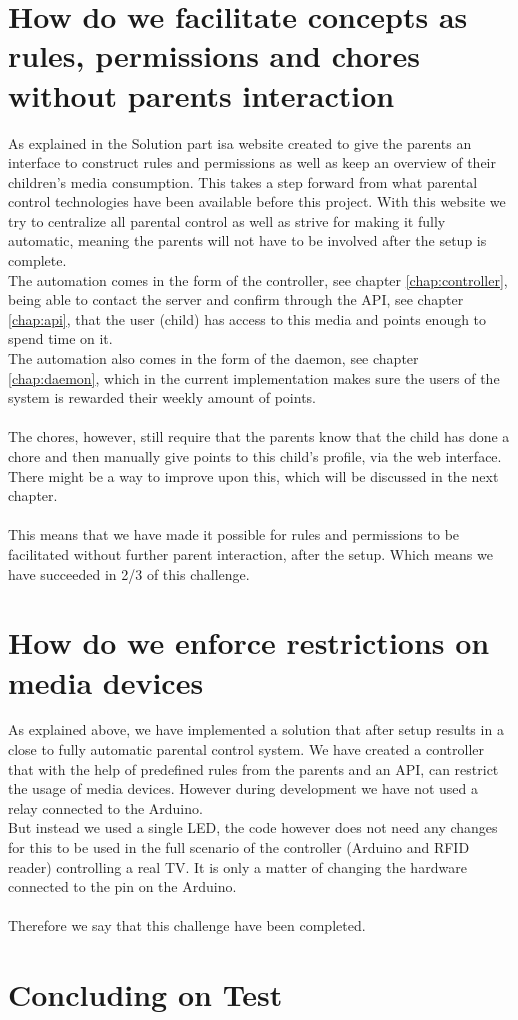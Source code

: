 \section*{How do we facilitate concepts as rules, permissions and chores without parents interaction}
As explained in the Solution part  isa website created to give the parents an interface to construct rules and permissions as well as keep an overview of their children's media consumption. This takes a step forward from what parental control technologies have been available before this project. With this website we try to centralize all parental control as well as strive for making it fully automatic, meaning the parents will not have to be involved after the setup is complete.\\
The automation comes in the form of the controller, see chapter \vref{chap:controller}, being able to contact the server and confirm through the API, see chapter \vref{chap:api}, that the user (child) has access to this media and points enough to spend time on it.\\
The automation also comes in the form of the daemon, see chapter \vref{chap:daemon}, which in the current implementation makes sure the users of the system is rewarded their weekly amount of points.\\
\\
The chores, however, still require that the parents know that the child has done a chore and then manually give points to this child's profile, via the web interface. There might be a way to improve upon this, which will be discussed in the next chapter.\\
\\
This means that we have made it possible for rules and permissions to be facilitated without further parent interaction, after the setup. Which means we have succeeded in 2/3 of this challenge.

\section*{How do we enforce restrictions on media devices}
As explained above, we have implemented a solution that after setup results in a close to fully automatic parental control system. We have created a controller that with the help of predefined rules from the parents and an API, can restrict the usage of media devices. However during development we have not used a relay connected to the Arduino. \\
But instead we used a single LED, the code however does not need any changes for this to be used in the full scenario of the controller (Arduino and RFID reader) controlling a real TV. It is only a matter of changing the hardware connected to the pin on the Arduino.\\
\\
Therefore we say that this challenge have been completed.

\section*{Concluding on Test}